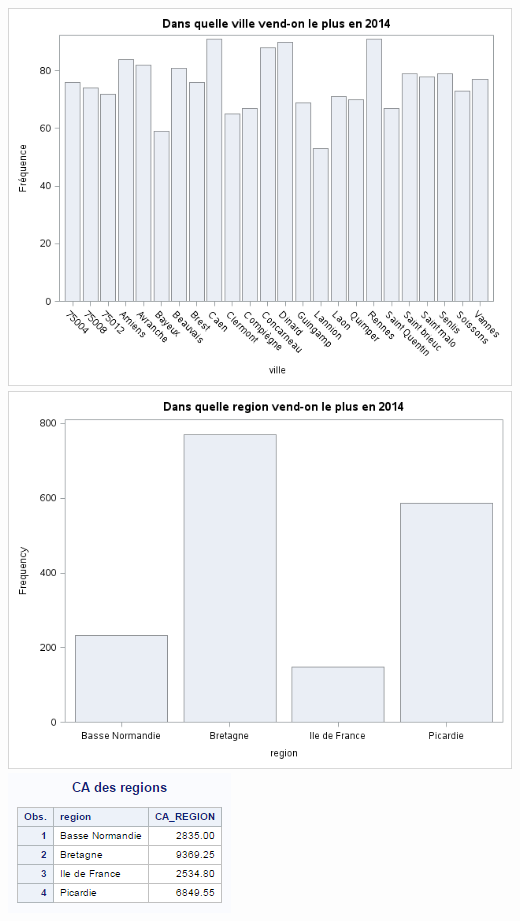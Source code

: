 \includegraphics[scale=0.7]{./images/sas_report/ville_2014-frequence.png}
\includegraphics[scale=0.7]{./images/sas_report/region_2014.png}
\includegraphics[scale=0.7]{./images/sas_report/table_sas.PNG}
